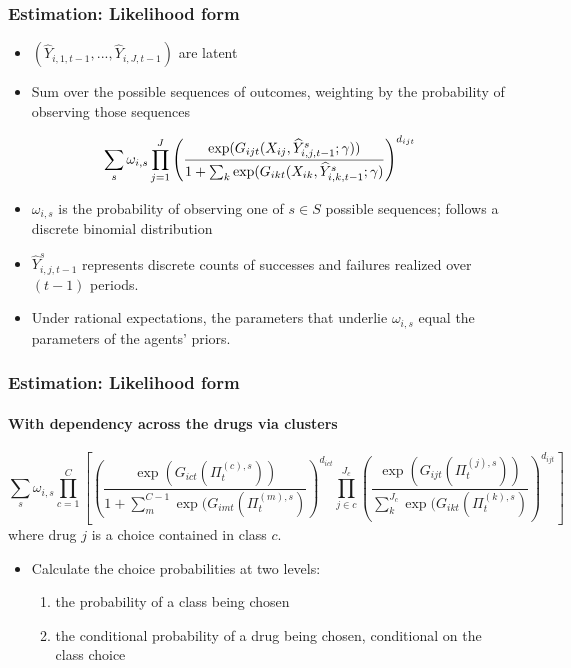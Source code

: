 \documentclass[aspectratio=169,11pt]{beamer}
\begin{document}
\begin{frame}
\frametitle{Estimation: Likelihood form}

\begin{itemize}
\item $(\widehat{Y}_{i,1,t-1},...,\widehat{Y}_{i,J,t-1})$ are latent

\item Sum over the possible sequences of outcomes, weighting by the
probability of observing those sequences
\end{itemize}

\[
\sum_{s}\omega_{i,s}\prod_{j=1}^{J}\left( \frac{\exp (G_{ijt}(X_{ij},%
\widehat{Y}^{s}_{i,j,t-1};\gamma ))}{1+\sum_{k}\exp (G_{ikt}(X_{ik},\widehat{%
Y}^{s}_{i,k,t-1};\gamma )}\right) ^{d_{ijt}}
\]

\begin{itemize}
\item $\omega_{i,s}$ is the probability of observing one of $s\in S$
possible sequences; follows a discrete binomial distribution

\item $\widehat{Y}^{s}_{i,j,t-1}$ represents discrete counts of successes
and failures realized over $(t-1)$ periods.

\item Under rational expectations, the parameters that underlie $\omega_{i,s}
$ equal the parameters of the agents' priors.
\end{itemize}

\hyperlink{RESULTS}{}
\end{frame}


\begin{frame}
\frametitle{Estimation: Likelihood form} \framesubtitle{With dependency
across the drugs via clusters}

{\footnotesize 
\[
\sum_{s}\omega_{i,s}\prod_{c=1}^{C}\left[\left( \frac{\exp (G_{ict}(\Pi
_{t}^{(c),s}))}{1+\sum_{m}^{C-1}\exp (G_{imt}(\Pi _{t}^{(m),s})}\right)
^{d_{ict}}\prod_{j\in c}^{J_{c}}\left( \frac{\exp (G_{ijt}(\Pi _{t}^{(j),s}))%
}{\sum_{k}^{J_{c}}\exp (G_{ikt}(\Pi _{t}^{(k),s})}\right) ^{d_{ijt}}\right]
\]
}{\normalsize where drug $j$ is a choice contained in class $c$. \bigskip }

\begin{itemize}
\item {\normalsize Calculate the choice probabilities at two levels: }

\begin{enumerate}
\item {\normalsize the probability of a class being chosen }

\item {\normalsize the conditional probability of a drug being chosen,
conditional on the class choice }
\end{enumerate}
\end{itemize}

{\normalsize \hyperlink{RESULTS}{} }
\end{frame}
\end{document}
